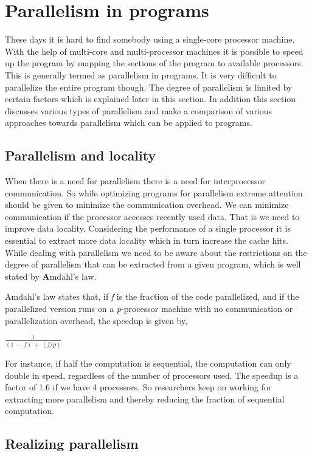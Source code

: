 \label{chap:background}

\section{Parallelism in programs}
These days it is hard to find somebody using a single-core processor machine.
With the help of multi-core and multi-processor machines it is possible to speed up 
the program by mapping the sections of the program to available processors. This 
is generally termed as parallelism in programs. It is very difficult to parallelize
the entire program though. The degree of parallelism is limited by certain factors which is
explained later in this section. In addition this section discusses various types of parallelism and
make a comparison of various approaches towards parallelism which can be applied to programs.

\subsection{Parallelism and locality}
When there is a need for parallelism there is a need for interprocessor communication.
So while optimizing programs for parallelism extreme attention should be given to
minimize the communication overhead. We can minimize communication if the
processor accesses recently used data. That is we need to improve data
locality. Considering the performance of a single processor it is
essential to extract more data locality which in turn increase
the cache hits. While dealing with parallelism we need to be aware
about the restrictions on the degree of parallelism that can
be extracted from a given program, which is well stated by {\textbf Amdahl}'s law.

Amdahl's law  states that, if \emph{f} is the fraction of the code parallelized, and if
the parallelized version runs on a \emph{p}-processor machine with no communication
or parallelization overhead, the speedup is given by,
\begin{center}
$\frac{1}{(1\ -\ f)\ +\ (f/p)}$
\end{center}

For instance, if half the computation is sequential, the computation can only
double in speed, regardless of the number of processors used. The speedup
is a factor of 1.6 if we have 4 processors. So researchers keep on working
for extracting more parallelism and thereby reducing the fraction of sequential
computation.

\subsection{Realizing parallelism}


